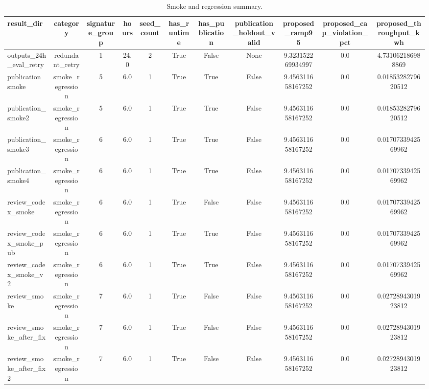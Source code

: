 \begin{table}[t]
\centering
\caption{Smoke and regression summary.}
\label{tab:smoke_summary_auto}
\begin{tabular}{lcccccccccc}
\toprule
result\_dir & category & signature\_group & hours & seed\_count & has\_runtime & has\_publication & publication\_holdout\_valid & proposed\_ramp95 & proposed\_cap\_violation\_pct & proposed\_throughput\_kwh \\
\midrule
outputs\_24h\_eval\_retry & redundant\_retry & 1 & 24.0 & 2 & True & False & None & 9.323152269934997 & 0.0 & 4.731062186988869 \\
publication\_smoke & smoke\_regression & 5 & 6.0 & 1 & True & True & False & 9.456311658167252 & 0.0 & 0.0185328279620512 \\
publication\_smoke2 & smoke\_regression & 5 & 6.0 & 1 & True & True & False & 9.456311658167252 & 0.0 & 0.0185328279620512 \\
publication\_smoke3 & smoke\_regression & 6 & 6.0 & 1 & True & True & False & 9.456311658167252 & 0.0 & 0.0170733942569962 \\
publication\_smoke4 & smoke\_regression & 6 & 6.0 & 1 & True & True & False & 9.456311658167252 & 0.0 & 0.0170733942569962 \\
review\_codex\_smoke & smoke\_regression & 6 & 6.0 & 1 & True & False & False & 9.456311658167252 & 0.0 & 0.0170733942569962 \\
review\_codex\_smoke\_pub & smoke\_regression & 6 & 6.0 & 1 & True & True & False & 9.456311658167252 & 0.0 & 0.0170733942569962 \\
review\_codex\_smoke\_v2 & smoke\_regression & 6 & 6.0 & 1 & True & True & False & 9.456311658167252 & 0.0 & 0.0170733942569962 \\
review\_smoke & smoke\_regression & 7 & 6.0 & 1 & True & False & False & 9.456311658167252 & 0.0 & 0.0272894301923812 \\
review\_smoke\_after\_fix & smoke\_regression & 7 & 6.0 & 1 & True & False & False & 9.456311658167252 & 0.0 & 0.0272894301923812 \\
review\_smoke\_after\_fix2 & smoke\_regression & 7 & 6.0 & 1 & True & False & False & 9.456311658167252 & 0.0 & 0.0272894301923812 \\
\bottomrule
\end{tabular}
\end{table}